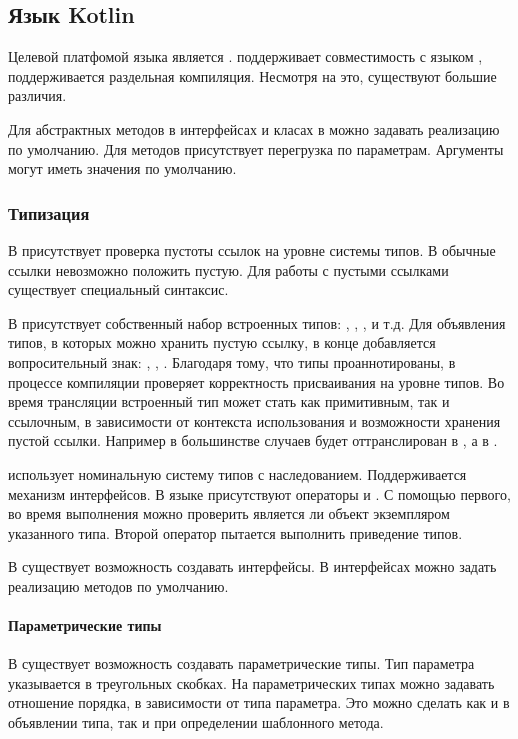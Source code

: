 \subsection{Язык Kotlin}

Целевой платфомой языка  является .  поддерживает совместимость с языком  \cite{kotlin:compatibility}, поддерживается раздельная компиляция. Несмотря на это, существуют большие различия.

Для абстрактных методов в интерфейсах и класах в  можно задавать реализацию по умолчанию. Для методов присутствует перегрузка по параметрам. Аргументы могут иметь значения по умолчанию.

\subsubsection{Типизация}
В  присутствует проверка пустоты ссылок на уровне системы типов. В обычные ссылки невозможно положить пустую. Для работы с пустыми ссылками существует специальный синтаксис.

В  присутствует собственный набор встроенных типов: , , , и т.д. Для объявления типов, в которых можно хранить пустую ссылку, в конце добавляется вопросительный знак: , , . Благодаря тому, что типы проаннотированы, в процессе компиляции  проверяет корректность присваивания на уровне типов. Во время трансляции встроенный тип может стать как примитивным, так и ссылочным, в зависимости от контекста использования и возможности хранения пустой ссылки. Например в большинстве случаев  будет оттранслирован в , а  в .

 использует номинальную систему типов с наследованием. Поддерживается механизм интерфейсов. В языке присутствуют операторы  и . С помощью первого, во время выполнения можно проверить является ли объект экземпляром указанного типа. Второй оператор пытается выполнить приведение типов.

В  существует возможность создавать интерфейсы. В интерфейсах можно задать реализацию методов по умолчанию.

\paragraph{Параметрические типы}
В  существует возможность создавать параметрические типы. Тип параметра указывается в треугольных скобках. На параметрических типах можно задавать отношение порядка, в зависимости от типа параметра. Это можно сделать как и в объявлении типа, так и при определении шаблонного метода.
